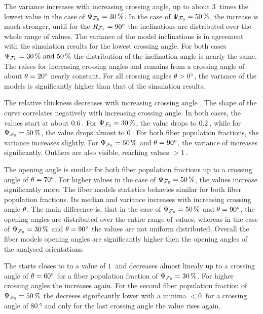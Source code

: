 The variance increases with increasing crossing angle, up to about $\SI{3}{}$ times the lowest value in the case of $\textnormal{$\Psi_{\textnormal{$\mathcal{F}_0$}}$} = \SI{30}{\percent}$.
In the case of $\textnormal{$\Psi_{\textnormal{$\mathcal{F}_0$}}$} = \SI{50}{\percent}$, the increase is much stronger, until for the $\textnormal{$R_{\textnormal{$\mathcal{F}_1$}}$}=\SI{90}{\degree}$ the inclinations are distributed over the whole range of values.
The \bvariance{} variance of the model inclinations is in agreement with the simulation results for the lowest crossing angle.
For both cases $\modelPsi = \SIlist{30;50}{\percent}$ the distribution of the inclination angle is nearly the same.
The \bvariance{} raises for increasing crossing angles and remains from a crossing angle of about $\textnormal{$\theta$} = \SI{20}{\degree}$ nearly constant.
For all crossing angles $\textnormal{$\theta$}>\SI{0}{\degree}$, the \bvariance{} variance of the models is significantly higher than that of the simulation results.
\par
The relative thickness \trel{} decreases with increasing crossing angle \modelOmega{}.
The shape of the curve correlates negatively with increasing crossing angle.
In both cases, the \trel{} values start at about $\SI{0.6}{}$.
For $\textnormal{$\Psi_{\textnormal{$\mathcal{F}_0$}}$} = \SI{30}{\percent}$, the \trel{} value drops to $\SI{0.2}{}$, while for $\textnormal{$\Psi_{\textnormal{$\mathcal{F}_0$}}$} = \SI{50}{\percent}$, the \trel{} value drops almost to $\SI{0}{}$.
For both fiber population fractions, the variance increases slightly.
For $\textnormal{$\Psi_{\textnormal{$\mathcal{F}_0$}}$} = \SI{50}{\percent}$ and $\textnormal{$\theta$} = \SI{90}{\degree}$, the variance of \trel{} increases significantly.
Outliers are also visible, reaching \trel{} values $>\SI{1}{}$.
\par
The opening angle \openingAngle{} is similar for both fiber population fractions up to a crossing angle of $\textnormal{$\theta$}=\SI{70}{\degree}$.
For higher values in the case of $\textnormal{$\Psi_{\textnormal{$\mathcal{F}_0$}}$} = \SI{50}{\percent}$, the values increase significantly more.
The fiber models statistics behavies similar for both fiber population fractions.
Its median and \bvariance{} variance increases with increasing crossing angle $\textnormal{$\theta$}$.
The main difference is, that in the case of $\textnormal{$\Psi_{\textnormal{$\mathcal{F}_0$}}$} = \SI{50}{\percent}$ and $\textnormal{$\theta$} = \SI{90}{\degree}$, the opening angles are distributed over the entire range of values, whereas in the case of $\textnormal{$\Psi_{\textnormal{$\mathcal{F}_0$}}$} = \SI{30}{\percent}$ and $\textnormal{$\theta$} = \SI{90}{\degree}$ the values are not uniform distributed.
Overall the fiber models opening angles are significantly higher then the opening angles of the analysed orientations.
\par
The \accvalue{} starts closes to to a value of $\SI{1}{}$ and decreases almost linealy up to a crossing angle of $\textnormal{$\theta$} = \SI{60}{\degree}$ for a fiber population fraction of $\textnormal{$\Psi_{\textnormal{$\mathcal{F}_0$}}$} = \SI{30}{\percent}$.
For higher crossing angles the \accvalue{} increases again.
For the second fiber population fraction of $\textnormal{$\Psi_{\textnormal{$\mathcal{F}_0$}}$} = \SI{50}{\percent}$ the \accvalue{} decreses significantly lower with a minima $<\SI{0}{}$ for a crossing angle of $\SI{80}{\degree}$ and only for the last crossing angle the value rises again.
% 
% 
%
